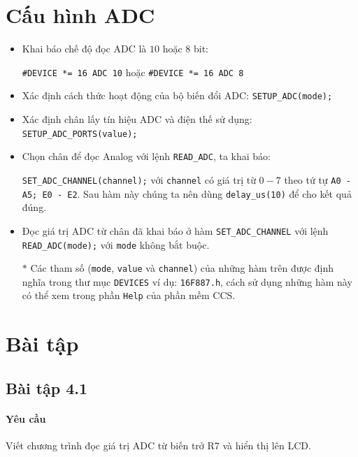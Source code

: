\section{Cấu hình ADC}
\begin{itemize}
\item Khai báo chế độ đọc ADC là $10$ hoặc $8$ bit:

\verb|#DEVICE *= 16 ADC 10| hoặc \verb|#DEVICE *= 16 ADC 8|
\item Xác định cách thức hoạt động của bộ biến đổi ADC: \verb|SETUP_ADC(mode);|
\item Xác định chân lấy tín hiệu ADC và điện thế sử dụng: \verb|SETUP_ADC_PORTS(value);|
\item Chọn chân để đọc Analog với lệnh \verb|READ_ADC|, ta khai báo:

\verb|SET_ADC_CHANNEL(channel);| với \verb|channel| có giá trị từ $0 - 7$ theo tứ tự \verb|A0 - A5; E0 - E2|. Sau hàm này chúng ta nên dùng \verb|delay_us(10)| để cho kết quả đúng.
\item Đọc giá trị ADC từ chân đã khai báo ở hàm \verb|SET_ADC_CHANNEL| với lệnh \verb|READ_ADC(mode);| với \verb|mode| không bắt buộc.
\item[$\ast$] Các tham số (\verb|mode|, \verb|value| và \verb|channel|) của những hàm trên được định nghĩa trong thư mục \verb|DEVICES| ví dụ: \verb|16F887.h|, cách sử dụng những hàm này có thể xem trong phần \verb|Help| của phần mềm CCS.
\end{itemize}
\section{Bài tập}
\subsection{Bài tập 4.1}
\paragraph{Yêu cầu}Viết chương trình đọc giá trị ADC từ biến trở R7 và hiển thị lên LCD.
